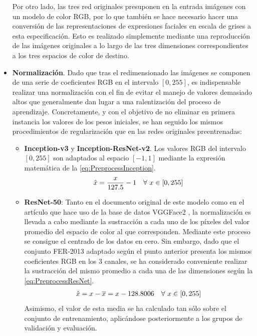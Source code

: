 \begin{itemize}
  Por otro lado, las tres red originales presuponen en la entrada imágenes con un modelo de color RGB, por lo que también se hace necesario hacer una conversión de las representaciones de expresiones faciales en escala de grises a esta especificación. Esto es realizado simplemente mediante una reproducción de las imágenes originales a lo largo de las tres dimensiones correspondientes a los tres espacios de color de destino.
  \item \textbf{Normalización}. Dado que tras el redimensionado las imágenes se componen de una serie de coeficientes RGB en el intervalo $[0, 255]$, es indispensable realizar una normalización con el fin de evitar el manejo de valores demasiado altos que generalmente dan lugar a una ralentización del proceso de aprendizaje. Concretamente, y con el objetivo de no eliminar en primera instancia los valores de los pesos iniciales, se han seguido los mismos procedimientos de regularización que en las redes originales preentrenadas:
        \begin{itemize}
            \item \textbf{Inception-v3} y \textbf{Inception-ResNet-v2}. Los valores RGB del intervalo $[0, 255]$ son adaptados al espacio $[-1, 1]$ mediante la expresión matemática de la \autoref{eq:PreprocessInception}.
                \begin{align} \label{eq:PreprocessInception}
                  \hat{x} &= \frac{x}{127.5} - 1 & \forall \text{\space} x \in [0, 255]
                \end{align}
            \item \textbf{ResNet-50}: Tanto en el documento original de este modelo \cite{ResNet} como en el artículo que hace uso de la base de datos VGGFace2 \cite{VGGFace2}, la normalización es llevada a cabo mediante la sustracción a cada uno de los píxeles del valor promedio del espacio de color al que corresponden. Mediante este proceso se consigue el centrado de los datos en cero. Sin embargo, dado que el conjunto FER-2013 adaptado según el punto anterior presenta los mismos coeficientes RGB en los 3 canales, se ha considerado conveniente realizar la sustracción del mismo promedio a cada una de las dimensiones según la \autoref{eq:PreprocessResNet}.
                \begin{align} \label{eq:PreprocessResNet}
                  \hat{x} &= x - \overline{x} = x - 128.8006 & \forall \text{\space} x \in [0, 255]
                \end{align}
            Asimismo, el valor de esta media se ha calculado tan sólo sobre el conjunto de entrenamiento, aplicándose posteriormente a los grupos de validación y evaluación. 
        \end{itemize}
        

\end{itemize}

